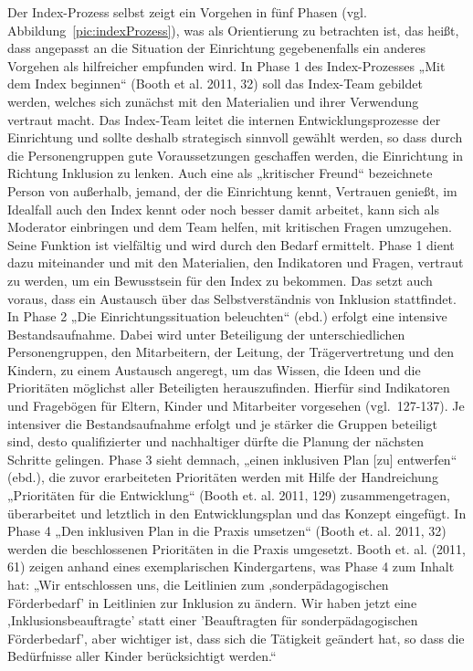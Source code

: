 Der Index-Prozess selbst zeigt ein Vorgehen in fünf Phasen (vgl. Abbildung~\ref{pic:indexProzess}), was als Orientierung zu betrachten ist, das heißt, dass angepasst an die Situation der Einrichtung gegebenenfalls ein anderes Vorgehen als hilfreicher empfunden wird.  
In Phase 1 des Index-Prozesses „Mit dem Index beginnen“ (Booth et al. 2011, 32) soll das Index-Team gebildet werden, welches sich zunächst mit den Materialien und ihrer Verwendung vertraut macht. Das Index-Team leitet die internen Entwicklungsprozesse der Einrichtung und sollte deshalb strategisch sinnvoll gewählt werden, so dass durch die Personengruppen gute  Voraussetzungen geschaffen werden, die Einrichtung in Richtung Inklusion zu lenken. Auch eine als „kritischer Freund“ bezeichnete Person von außerhalb, jemand, der die Einrichtung kennt, Vertrauen genießt, im Idealfall auch den Index kennt oder noch besser damit arbeitet, kann sich als Moderator einbringen und dem Team helfen, mit kritischen Fragen umzugehen. Seine Funktion ist vielfältig und wird durch den Bedarf ermittelt. Phase 1 dient dazu miteinander und mit den Materialien, den Indikatoren und Fragen, vertraut zu werden, um ein Bewusstsein für den Index zu bekommen. Das setzt auch voraus, dass ein Austausch über das Selbstverständnis von Inklusion stattfindet.  
In Phase 2 „Die Einrichtungssituation beleuchten“ (ebd.) erfolgt eine intensive Bestandsaufnahme. Dabei wird unter Beteiligung der  unterschiedlichen Personengruppen, den Mitarbeitern, der Leitung, der Trägervertretung und den Kindern, zu einem Austausch angeregt, um das Wissen, die Ideen und die Prioritäten möglichst aller Beteiligten herauszufinden. Hierfür sind Indikatoren und Fragebögen für Eltern, Kinder und Mitarbeiter vorgesehen (vgl.~127-137). Je intensiver die Bestandsaufnahme erfolgt und je stärker die Gruppen beteiligt sind, desto qualifizierter und nachhaltiger dürfte die Planung der nächsten Schritte gelingen. 
Phase 3 sieht demnach, „einen inklusiven Plan [zu] entwerfen“ (ebd.), die zuvor erarbeiteten Prioritäten werden mit Hilfe der Handreichung „Prioritäten für die Entwicklung“ (Booth et. al. 2011, 129) zusammengetragen, überarbeitet und letztlich in den Entwicklungsplan und das Konzept eingefügt.
In Phase 4 „Den inklusiven Plan in die Praxis umsetzen“ (Booth et. al. 2011, 32) werden die beschlossenen Prioritäten in die Praxis umgesetzt.  
Booth et. al. (2011, 61) zeigen anhand eines exemplarischen Kindergartens, was Phase 4 zum Inhalt hat: „Wir entschlossen uns, die Leitlinien zum ,sonderpädagogischen Förderbedarf' in Leitlinien zur Inklusion zu ändern. Wir haben jetzt eine ,Inklusionsbeauftragte' statt einer 'Beauftragten für sonderpädagogischen Förderbedarf', aber wichtiger ist, dass sich die Tätigkeit geändert hat, so dass die Bedürfnisse aller Kinder berücksichtigt werden.“   
